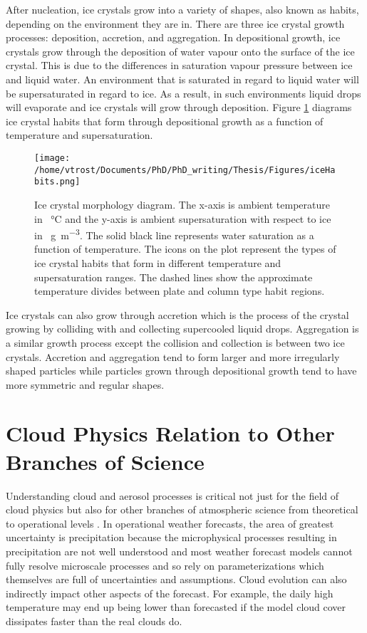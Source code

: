 After nucleation, ice crystals grow into a variety of shapes, also known as habits, depending on the environment they are in. There are three ice crystal growth processes: deposition, accretion, and aggregation. In depositional growth, ice crystals grow through the deposition of water vapour onto the surface of the ice crystal. This is due to the differences in saturation vapour pressure between ice and liquid water. An environment that is saturated in regard to liquid water will be supersaturated in regard to ice. As a result, in such environments liquid drops will evaporate and ice crystals will grow through deposition. \citep{rog1989} Figure \ref{fig:iceHabits} diagrams ice crystal habits that form through depositional growth as a function of temperature and supersaturation.

\begin{figure}[h]
	\centering
	\texttt{[image: /home/vtrost/Documents/PhD/PhD\_writing/Thesis/Figures/iceHabits.png]}
	\caption{Ice crystal morphology diagram. The x-axis is ambient temperature in \SI{}{\degreeCelsius} and the y-axis is ambient supersaturation with respect to ice in \SI{}{g m^{-3}}. The solid black line represents water saturation as a function of temperature. The icons on the plot represent the types of ice crystal habits that form in different temperature and supersaturation ranges. The dashed lines show the approximate temperature divides between plate and column type habit regions. \citep[][Figure 1]{libb2008}}
	\label{fig:iceHabits}
\end{figure}

Ice crystals can also grow through accretion which is the process of the crystal growing by colliding with and collecting supercooled liquid drops. Aggregation is a similar growth process except the collision and collection is between two ice crystals. Accretion and aggregation tend to form larger and more irregularly shaped particles while particles grown through depositional growth tend to have more symmetric and regular shapes. \citep{rog1989,lamb2011}

\section{Cloud Physics Relation to Other Branches of Science}
Understanding cloud and aerosol processes is critical not just for the field of cloud physics but also for other branches of atmospheric science from theoretical to operational levels \citep{lamb2011,mur2012}. In operational weather forecasts, the area of greatest uncertainty is precipitation because the microphysical processes resulting in precipitation are not well understood and most weather forecast models cannot fully resolve microscale processes and so rely on parameterizations which themselves are full of uncertainties and assumptions. Cloud evolution can also indirectly impact other aspects of the forecast. For example, the daily high temperature may end up being lower than forecasted if the model cloud cover dissipates faster than the real clouds do.

